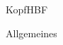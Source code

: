 \documentclass[oneside,openany,headings=optiontotoc,11pt,numbers=noenddot]{scrreprt}
\begin{document}
	\begin{test}{KopfHBF}
		\begin{framed}
			Allgemeines
		\end{framed}
	\end{test}
\end{document}
